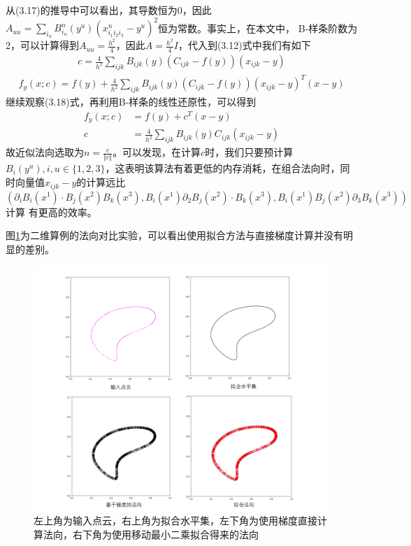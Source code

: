 从(3.17)的推导中可以看出，其导数恒为0，因此$A_{uu} = \sum_{i_u} B_{i_u}^n(y^u) (x_{i_1 i_2 i_3}^u - y^u)^2$恒为常数。事实上，在本文中，
B-样条阶数为2，可以计算得到$A_{uu} = \frac{h^2}{4}$，因此$A = \frac{h^2}{4}I$，代入到(3.12)式中我们有如下
\begin{equation}
    \begin{split}
        c = \frac{4}{h^2}\sum_{ijk}B_{ijk}(y)(C_{ijk} - f(y))(x_{ijk} - y)
    \end{split}
\end{equation}
\begin{equation}
    \begin{split}
        f_y(x;c) = f(y) + \frac{4}{h^2}\sum_{ijk}B_{ijk}(y)(C_{ijk} - f(y))(x_{ijk} - y)^T(x - y)
    \end{split}
\end{equation}
继续观察(3.18)式，再利用B-样条的线性还原性，可以得到
\begin{align}
    f_y(x;c) &= f(y) + c^T(x - y)\\
    c &= \frac{4}{h^2}\sum_{ijk}B_{ijk}(y)C_{ijk}(x_{ijk} - y)
\end{align}
故近似法向选取为$n = \frac{c}{\Vert c\Vert}$。可以发现，在计算$c$时，我们只要预计算$B_{i}(y^u), i,u \in \{1,2,3\}$，这表明该算法有着更低的内存消耗，在组合法向时，同时向量值$x_{ijk} - y$的计算远比$(\partial_i B_i(x^1) \cdot B_j(x^2)B_k(x^3), B_i(x^1)\partial_2 B_j(x^2)\cdot B_k(x^3), B_i(x^1)B_j(x^2)\partial_3B_k(x^3))$计算
有更高的效率。

图\ref{fig:normal_compare}为二维算例的法向对比实验，可以看出使用拟合方法与直接梯度计算并没有明显的差别。
\begin{figure}[htbp]
    \centering
    \includegraphics[scale=0.7]{./images/normal_compare.png}
    \caption[快速法向计算二维对比]{左上角为输入点云，右上角为拟合水平集，左下角为使用梯度直接计算法向，右下角为使用移动最小二乘拟合得来的法向}
    \label{fig:normal_compare}
\end{figure}

